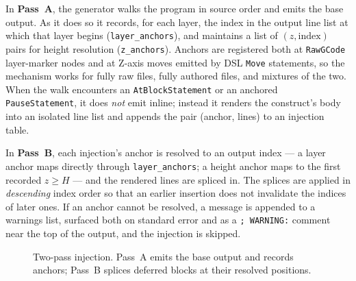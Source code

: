 In \textbf{Pass~A}, the generator walks the program in source order and emits the base output. As it does so it records, for each layer, the index in the output line list at which that layer begins (\texttt{layer\_anchors}), and maintains a list of $(z, \text{index})$ pairs for height resolution (\texttt{z\_anchors}). Anchors are registered both at \texttt{RawGCode} layer-marker nodes and at Z-axis moves emitted by DSL \texttt{Move} statements, so the mechanism works for fully raw files, fully authored files, and mixtures of the two. When the walk encounters an \texttt{AtBlockStatement} or an anchored \texttt{PauseStatement}, it does \emph{not} emit inline; instead it renders the construct's body into an isolated line list and appends the pair (anchor, lines) to an injection table.

In \textbf{Pass~B}, each injection's anchor is resolved to an output index --- a layer anchor maps directly through \texttt{layer\_anchors}; a height anchor maps to the first recorded $z \geq H$ --- and the rendered lines are spliced in. The splices are applied in \emph{descending} index order so that an earlier insertion does not invalidate the indices of later ones. If an anchor cannot be resolved, a message is appended to a warnings list, surfaced both on standard error and as a \verb|; WARNING:| comment near the top of the output, and the injection is skipped.

\begin{figure}[H]
\centering
{}
\caption{Two-pass injection. Pass~A emits the base output and records anchors; Pass~B splices deferred blocks at their resolved positions.}
\label{fig:m3-injection}
\end{figure}

